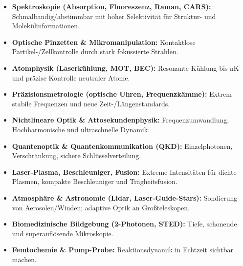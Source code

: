 \begin{tcolorbox}[didaktikbox, title={Anwendungen von Lasern — Forschung (Überblick)}] 
	\label{box:laser-app-forschung}
	\begin{itemize}
		\item \textbf{Spektroskopie (Absorption, Fluoreszenz, Raman, CARS):} Schmalbandig/abstimmbar mit hoher Selektivität für Struktur- und Molekülinformationen.
		\item \textbf{Optische Pinzetten \& Mikromanipulation:} Kontaktlose Partikel-/Zellkontrolle durch stark fokussierte Strahlen.
		\item \textbf{Atomphysik (Laserkühlung, MOT, BEC):} Resonante Kühlung bis nK und präzise Kontrolle neutraler Atome.
		\item \textbf{Präzisionsmetrologie (optische Uhren, Frequenzkämme):} Extrem stabile Frequenzen und neue Zeit-/Längenstandards.
		\item \textbf{Nichtlineare Optik \& Attosekundenphysik:} Frequenzumwandlung, Hochharmonische und ultraschnelle Dynamik.
		\item \textbf{Quantenoptik \& Quantenkommunikation (QKD):} Einzelphotonen, Verschränkung, sichere Schlüsselverteilung.
		\item \textbf{Laser-Plasma, Beschleuniger, Fusion:} Extreme Intensitäten für dichte Plasmen, kompakte Beschleuniger und Trägheitsfusion.
		\item \textbf{Atmosphäre \& Astronomie (Lidar, Laser-Guide-Stars):} Sondierung von Aerosolen/Winden; adaptive Optik an Großteleskopen.
		\item \textbf{Biomedizinische Bildgebung (2-Photonen, STED):} Tiefe, schonende und superauflösende Mikroskopie.
		\item \textbf{Femtochemie \& Pump-Probe:} Reaktionsdynamik in Echtzeit sichtbar machen.
	\end{itemize}
\end{tcolorbox}

